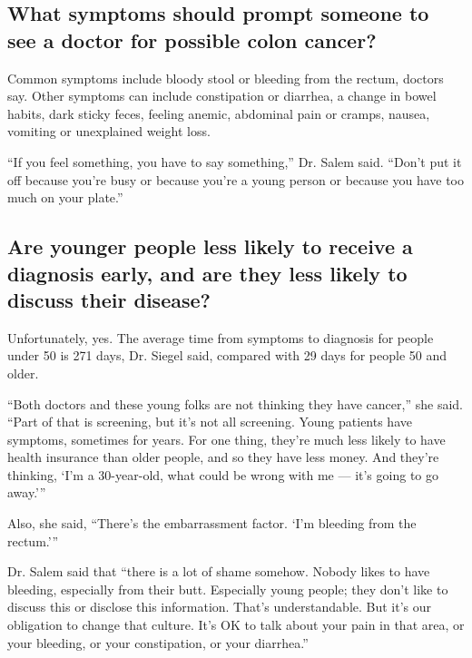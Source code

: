 \hypertarget{what-symptoms-should-prompt-someone-to-see-a-doctor-for-possible-colon-cancer}{%
\subsection{What symptoms should prompt someone to see a doctor for
possible colon
cancer?}\label{what-symptoms-should-prompt-someone-to-see-a-doctor-for-possible-colon-cancer}}

Common symptoms include bloody stool or bleeding from the rectum,
doctors say. Other symptoms can include constipation or diarrhea, a
change in bowel habits, dark sticky feces, feeling anemic, abdominal
pain or cramps, nausea, vomiting or unexplained weight loss.

``If you feel something, you have to say something,'' Dr. Salem said.
``Don't put it off because you're busy or because you're a young person
or because you have too much on your plate.''

\hypertarget{are-younger-people-less-likely-to-receive-a-diagnosis-early-and-are-they-less-likely-to-discuss-their-disease}{%
\subsection{Are younger people less likely to receive a diagnosis early,
and are they less likely to discuss their
disease?}\label{are-younger-people-less-likely-to-receive-a-diagnosis-early-and-are-they-less-likely-to-discuss-their-disease}}

Unfortunately, yes. The average time from symptoms to diagnosis for
people under 50 is 271 days, Dr. Siegel said, compared with 29 days for
people 50 and older.

``Both doctors and these young folks are not thinking they have
cancer,'' she said. ``Part of that is screening, but it's not all
screening. Young patients have symptoms, sometimes for years. For one
thing, they're much less likely to have health insurance than older
people, and so they have less money. And they're thinking, `I'm a
30-year-old, what could be wrong with me --- it's going to go away.'''

Also, she said, ``There's the embarrassment factor. `I'm bleeding from
the rectum.'''

Dr. Salem said that ``there is a lot of shame somehow. Nobody likes to
have bleeding, especially from their butt. Especially young people; they
don't like to discuss this or disclose this information. That's
understandable. But it's our obligation to change that culture. It's OK
to talk about your pain in that area, or your bleeding, or your
constipation, or your diarrhea.''

